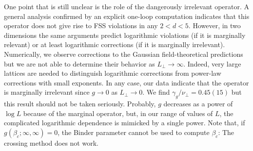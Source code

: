 \documentclass[12pt]{article}
\begin{document}
One point that is still unclear is the role of the dangerously irrelevant 
operator. A general analysis confirmed by an explicit one-loop computation
indicates that this operator does not give rise 
to FSS violations in any $2 < d < 5$. However, in two dimensions 
the same arguments predict logarithmic violations (if it is marginally
relevant) or at least logarithmic 
corrections (if it is marginally irrelevant). 
Numerically, we observe corrections to the Gaussian field-theoretical 
predictions but we are not able to determine their behavior as 
$L_\bot\to\infty$.
Indeed, very large lattices 
are needed to distinguish logarithmic corrections from power-law 
corrections with small exponents. In any case, our data indicate that 
the operator is marginally irrelevant since $g\to 0$ as $L_\bot \to 0$.
We find $\gamma_g/\nu_\bot = 0.45(15)$ but this result should not be taken
seriously. 
Probably, $g$ decreases as a power of $\log L$ because of the
marginal operator, but, in our range of values of $L$,
the complicated logarithmic dependence is mimicked by a single power.      
Note that, if $g(\beta_c;\infty,\infty) = 0$, the Binder parameter 
cannot be used to compute $\beta_c$: The crossing method does not work.
\end{document}
